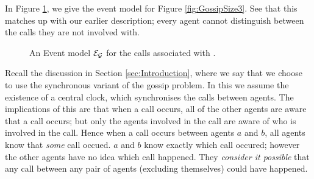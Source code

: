 \documentclass[10pt, a4paper]{report}
\begin{document}
In Figure \ref{fig:GossipEvMo}, we give the event model for Figure
\ref{fig:GossipSize3}. See that this matches up with our earlier description;
every agent cannot distinguish between the calls they are not involved with.

\begin{figure}[h]
  \centering
  \caption{An Event model $\mathcal{E_G}$ for the calls associated with .}
  \label{fig:GossipEvMo}
\end{figure}


Recall the discussion in Section \ref{sec:Introduction}, where we say that we
choose to use the synchronous variant of the gossip problem. In this we assume
the existence of a central clock, which synchronises the calls between agents.
The implications of this are that when a call occurs, all of the other agents
are aware that a call occurs; but only the agents involved in the call are aware
of who is involved in the call. Hence when a call occurs between agents $a$ and
$b$, all agents know that \emph{some} call occued. $a$ and $b$ know exactly
which call occured; however the other agents have no idea which call happened.
They \emph{consider it possible} that any call between any pair of agents
(excluding themselves) could have happened.
\end{document}
